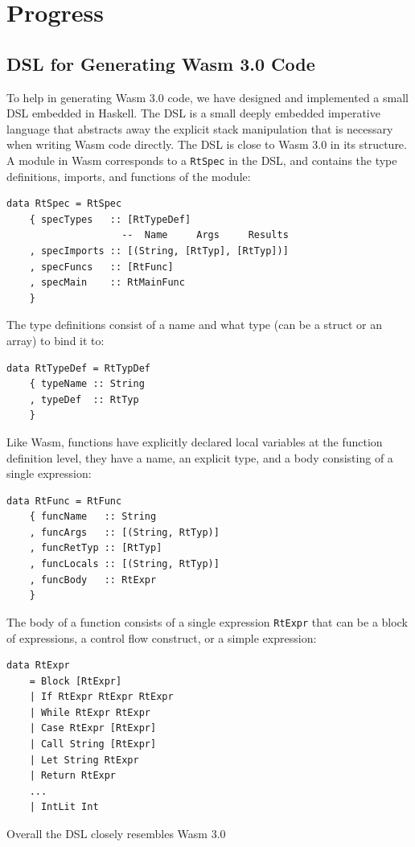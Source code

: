 \chapter{Progress}\label{ch:progress}
\section{DSL for Generating Wasm 3.0 Code}
To help in generating Wasm 3.0 code, we have designed and implemented a small DSL embedded in Haskell. The DSL is a small deeply embedded imperative language \cite{dsl} that abstracts away the explicit stack manipulation that is necessary when writing Wasm code directly. The DSL is close to Wasm 3.0 in its structure. A module in Wasm corresponds to a \verb|RtSpec| in the DSL, and contains the type definitions, imports, and functions of the module:
\begin{verbatim}
data RtSpec = RtSpec
    { specTypes   :: [RtTypeDef]
                    --  Name     Args     Results
    , specImports :: [(String, [RtTyp], [RtTyp])]
    , specFuncs   :: [RtFunc]
    , specMain    :: RtMainFunc
    }
\end{verbatim}
The type definitions consist of a name and what type (can be a struct or an array) to bind it to:
\begin{verbatim}
data RtTypeDef = RtTypDef
    { typeName :: String
    , typeDef  :: RtTyp
    }
\end{verbatim}
Like Wasm, functions have explicitly declared local variables at the function definition level, they have a name, an explicit type, and a body consisting of a single expression:
\begin{verbatim}
data RtFunc = RtFunc
    { funcName   :: String
    , funcArgs   :: [(String, RtTyp)]
    , funcRetTyp :: [RtTyp]
    , funcLocals :: [(String, RtTyp)]
    , funcBody   :: RtExpr
    }
\end{verbatim}
The body of a function consists of a single expression \verb|RtExpr| that can be a block of expressions, a control flow construct, or a simple expression:
\begin{verbatim}
data RtExpr
    = Block [RtExpr]
    | If RtExpr RtExpr RtExpr
    | While RtExpr RtExpr
    | Case RtExpr [RtExpr]
    | Call String [RtExpr]
    | Let String RtExpr
    | Return RtExpr
    ...
    | IntLit Int
\end{verbatim}
Overall the DSL closely resembles Wasm 3.0


